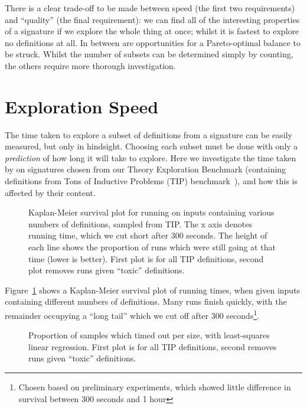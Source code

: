 There is a clear trade-off to be made between speed (the first two requirements)
and ``quality'' (the final requirement): we can find all of the interesting
properties of a signature if we explore the whole thing at once; whilst it
is fastest to explore no definitions at all. In between are opportunities for a
Pareto-optimal balance to be struck. Whilst the number of subsets can be
determined simply by counting, the others require more thorough investigation.

\section{Exploration Speed}

The time taken to explore a subset of definitions from a signature can be easily
measured, but only in hindsight. Choosing each subset must be done with only a
\emph{prediction} of how long it will take to explore. Here we investigate the
time taken by \quickspec{} on signatures chosen from our Theory Exploration
Benchmark (containing definitions from Tons of Inductive Problems (TIP)
benchmark~\cite{claessen2015tip}), and how this is affected by their content.

\begin{figure}
  \centering
  \scalebox{0.45}{}
  \scalebox{0.45}{}
  \caption{Kaplan-Meier survival plot for running \quickspec{} on inputs
    containing various numbers of definitions, sampled from TIP. The x axis
    denotes running time, which we cut short after 300 seconds. The height of
    each line shows the proportion of \quickspec{} runs which were still going at
    that time (lower is better). First plot is for all TIP definitions, second
    plot removes runs given ``toxic'' definitions.}
  \label{fig:survival}
\end{figure}

Figure~\ref{fig:survival} shows a Kaplan-Meier survival plot of \quickspec{}
running times, when given inputs containing different numbers of definitions. Many runs
finish quickly, with the remainder occupying a ``long tail'' which we cut off
after 300 seconds\footnote{Chosen based on preliminary experiments, which showed
  little difference in survival between 300 seconds and 1 hour}.

\begin{figure}
  \scalebox{0.45}{}
  \scalebox{0.45}{}
  \caption{Proportion of samples which timed out per size, with least-squares
    linear regression. First plot is for all TIP definitions, second removes
    runs given ``toxic'' definitions.}
  \label{fig:tailsize}
\end{figure}

